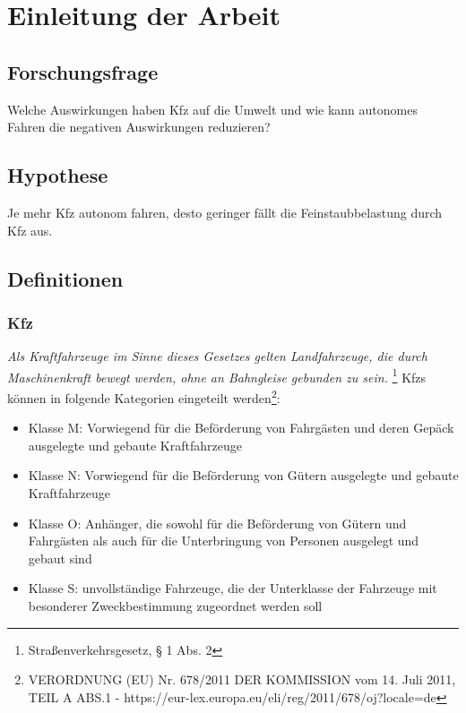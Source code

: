 \chapter{Einleitung der Arbeit}

\section{Forschungsfrage}

Welche Auswirkungen haben \ac{Kfz} auf die Umwelt und wie kann autonomes Fahren die negativen Auswirkungen reduzieren?

\section{Hypothese}

Je mehr \ac{Kfz} autonom fahren, desto geringer fällt die Feinstaubbelastung durch \ac{Kfz} aus.

\section{Definitionen}
\subsection{\ac{Kfz}}

\textit{Als Kraftfahrzeuge im Sinne dieses Gesetzes gelten Landfahrzeuge, die durch Maschinenkraft bewegt werden, ohne an Bahngleise gebunden zu sein.}
\footnote{Straßenverkehrsgesetz, § 1 Abs. 2}
\vspace{0.5cm}
\newline
\aclp{Kfz} können in folgende Kategorien eingeteilt werden\footnote{VERORDNUNG (EU) Nr. 678/2011 DER KOMMISSION
	vom 14. Juli 2011, TEIL A ABS.1 - https://eur-lex.europa.eu/eli/reg/2011/678/oj?locale=de}:
\begin{itemize}
	\item Klasse M: Vorwiegend für die Beförderung von Fahrgästen und deren Gepäck ausgelegte und gebaute Kraftfahrzeuge
	\item Klasse N: Vorwiegend für die Beförderung von Gütern ausgelegte und gebaute Kraftfahrzeuge
	\item Klasse O: Anhänger, die sowohl für die Beförderung von Gütern und Fahrgästen als auch für die Unterbringung von Personen ausgelegt und gebaut sind
	\item Klasse S: unvollständige Fahrzeuge, die der Unterklasse der Fahrzeuge mit besonderer Zweckbestimmung zugeordnet werden soll
\end{itemize}

